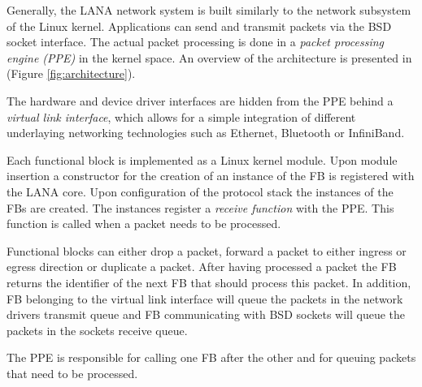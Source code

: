 \documentclass{sig-alternate}
\newcommand{\daniel}[1]{\textcolor{red}{\emph{DB: #1}}}
\begin{document}
Generally, the LANA network system is built similarly to the network subsystem of the Linux kernel.
Applications can send and transmit packets via the BSD socket interface. The actual packet processing is done in a \textit{packet processing engine (PPE)} in the kernel space. An overview of the architecture is presented in (Figure \ref{fig:architecture}).


The hardware and device driver interfaces are hidden from the PPE behind a \textit{virtual link interface}, which allows for a simple integration of different underlaying networking technologies such as Ethernet, Bluetooth or InfiniBand.

Each functional block is implemented as a Linux kernel module. 
Upon module insertion a constructor for the creation of an instance of the FB is registered with the LANA core. Upon configuration of the protocol stack the instances of the FBs are created. The instances register a \textit{receive function} with the PPE. This function is called when a packet needs to be processed.

Functional blocks can either drop a packet, forward a packet to either ingress or egress direction or duplicate a packet. After having processed a packet the FB returns the identifier of the next FB that should process this packet. In addition, FB belonging to the virtual link interface will queue the packets in the network drivers transmit queue and FB communicating with BSD sockets will queue the packets in the sockets receive queue.

The PPE is responsible for calling one FB after the other and for queuing packets that need to be processed.

\end{document}
